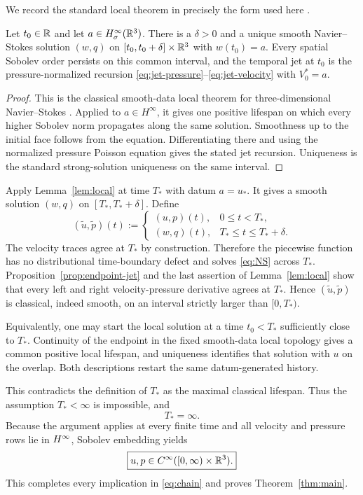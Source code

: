 We record the standard local theorem in precisely the form used here
\cite{Temam}.

\begin{lemma}
\label{lem:local}
Let \(t_0\in\mathbb R\) and let \(a\in H^\infty_\sigma(\mathbb R^3)\).  There is a
\(\delta>0\) and a unique smooth Navier--Stokes solution \((w,q)\) on
\([t_0,t_0+\delta]\times\mathbb R^3\) with \(w(t_0)=a\).  Every spatial Sobolev
order persists on this common interval, and the temporal jet at \(t_0\) is
the pressure-normalized recursion
\eqref{eq:jet-pressure}--\eqref{eq:jet-velocity} with \(V_0^*=a\).
\end{lemma}

\begin{proof}
This is the classical smooth-data local theorem for three-dimensional
Navier--Stokes \cite{Temam}.  Applied to \(a\in H^\infty\), it gives one
positive lifespan on which every higher Sobolev norm propagates along the same
solution.  Smoothness up to the initial face follows from the equation.
Differentiating there and using the normalized pressure Poisson equation gives
the stated jet recursion.  Uniqueness is the standard strong-solution
uniqueness on the same interval.
\end{proof}

Apply Lemma~\ref{lem:local} at time \(T_*\) with datum \(a=u_*\). It gives a
smooth solution \((w,q)\) on \([T_*,T_*+\delta]\). Define
\[
 (\widetilde u,\widetilde p)(t)
 :=
 \begin{cases}
 (u,p)(t),&0\leq t<T_*,\\
 (w,q)(t),&T_*\leq t\leq T_*+\delta.
 \end{cases}
\]
The velocity traces agree at \(T_*\) by construction. Therefore the
piecewise function has no distributional time-boundary defect and solves
\eqref{eq:NS} across \(T_*\). Proposition~\ref{prop:endpoint-jet} and the
last assertion of Lemma~\ref{lem:local} show that every left and right
velocity-pressure derivative agrees at \(T_*\). Hence
\((\widetilde u,\widetilde p)\) is classical, indeed smooth, on an interval
strictly larger than \([0,T_*)\).

Equivalently, one may start the local solution at a time
\(t_0<T_*\) sufficiently close to \(T_*\).  Continuity of the endpoint in
the fixed smooth-data local topology gives a common positive local lifespan,
and uniqueness identifies that solution with \(u\) on the overlap.  Both
descriptions restart the same datum-generated history.

This contradicts the definition of \(T_*\) as the maximal classical
lifespan. Thus the assumption \(T_*<\infty\) is impossible, and
\[
 \boxed{T_*=\infty.}
\]
Because the argument applies at every finite time and all velocity and
pressure rows lie in \(H^\infty\), Sobolev embedding yields
\[
 \boxed{u,p\in C^\infty([0,\infty)\times\mathbb R^3).}
\]
This completes every implication in \eqref{eq:chain} and proves
Theorem~\ref{thm:main}.
